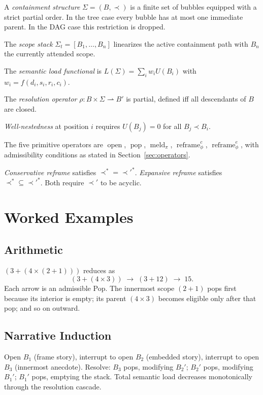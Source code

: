 \documentclass[12pt, a4paper]{article}
\theoremstyle{plain}
\theoremstyle{definition}
\theoremstyle{remark}
\DeclareMathOperator{\Open}{open}
\DeclareMathOperator{\Pop}{pop}
\DeclareMathOperator{\Meld}{meld}
\DeclareMathOperator{\Reframe}{reframe}
\begin{document}
A \emph{containment structure} $\Sigma = (B, \prec)$ is a finite set of
bubbles equipped with a strict partial order. In the tree case every bubble
has at most one immediate parent. In the DAG case this restriction is dropped.

The \emph{scope stack} $\Sigma_t = [B_1, \ldots, B_n]$ linearizes the active
containment path with $B_n$ the currently attended scope.

The \emph{semantic load functional} is $L(\Sigma) = \sum_i w_i U(B_i)$ with
$w_i = f(d_i, s_i, r_i, c_i)$.

The \emph{resolution operator} $\rho : B \times \Sigma \rightharpoonup B'$
is partial, defined iff all descendants of $B$ are closed.

\emph{Well-nestedness} at position $i$ requires $U(B_j) = 0$ for all $B_j
\prec B_i$.

The five primitive operators are $\Open$, $\Pop$, $\Meld_\pi$,
$\Reframe^c_\phi$, $\Reframe^e_\phi$, with admissibility conditions as
stated in Section~\ref{sec:operators}.

\emph{Conservative reframe} satisfies $\prec^* = \prec'^*$.
\emph{Expansive reframe} satisfies $\prec^* \subseteq \prec'^*$.
Both require $\prec'$ to be acyclic.

\section{Worked Examples}

\subsection*{Arithmetic}

$( 3 + ( 4 \times ( 2 + 1 ) ) )$ reduces as
\[
  (3 + (4 \times 3)) \;\to\; (3 + 12) \;\to\; 15.
\]
Each arrow is an admissible Pop. The innermost scope $(2+1)$ pops first
because its interior is empty; its parent $(4 \times 3)$ becomes eligible
only after that pop; and so on outward.

\subsection*{Narrative Induction}

Open $B_1$ (frame story), interrupt to open $B_2$ (embedded story), interrupt
to open $B_3$ (innermost anecdote). Resolve: $B_3$ pops, modifying $B_2'$;
$B_2'$ pops, modifying $B_1'$; $B_1'$ pops, emptying the stack. Total
semantic load decreases monotonically through the resolution cascade.
\end{document}
